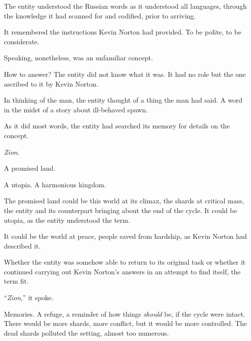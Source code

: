 The entity understood the Russian words as it understood all languages, through the knowledge it had scanned for and codified, prior to arriving.



It remembered the instructions Kevin Norton had provided.  To be polite, to be considerate.



Speaking, nonetheless, was an unfamiliar concept.



How to answer?  The entity did not know what it was.  It had no role but the one ascribed to it by Kevin Norton.



In thinking of the man, the entity thought of a thing the man had said.  A word in the midst of a story about ill-behaved spawn.



As it did most words, the entity had searched its memory for details on the concept.



\emph{Zion}.



A promised land.



A utopia.  A harmonious kingdom.



The promised land could be this world at its climax, the shards at critical mass, the entity and its counterpart bringing about the end of the cycle.  It could be utopia, as the entity understood the term.



It could be the world at peace, people saved from hardship, as Kevin Norton had described it.



Whether the entity was somehow able to return to its original task or whether it continued carrying out Kevin Norton's answers in an attempt to find itself, the term fit.



``\emph{Zion},'' it spoke.



\blacksquare



Memories.  A refuge, a reminder of how things \emph{should} be, if the cycle were intact.  There would be more shards, more conflict, but it would be more controlled.  The dead shards polluted the setting, almost too numerous.




